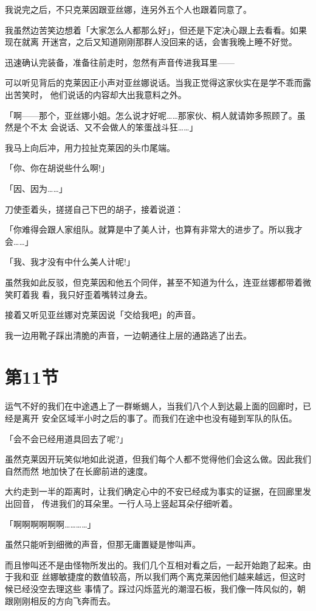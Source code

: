 \documentclass[11pt]{book}
\begin{document}
我说完之后，不只克莱因跟亚丝娜，连另外五个人也跟着同意了。

我虽然边苦笑边想着「大家怎么人都那么好」，但还是下定决心跟上去看看。如果现在就离
开迷宫，之后又知道刚刚那群人没回来的话，会害我晚上睡不好觉。

迅速确认完装备，准备往前走时，忽然有声音传进我耳里——

可以听见背后的克莱因正小声对亚丝娜说话。当我正觉得这家伙实在是学不乖而露出苦笑时，
他们说话的内容却大出我意料之外。

「啊——那个，亚丝娜小姐。怎么说才好呢……那家伙、桐人就请妳多照顾了。虽然是个不太
会说话、又不会做人的笨蛋战斗狂……」

我马上向后冲，用力拉扯克莱因的头巾尾端。

「你、你在胡说些什么啊!」

「因、因为……」

刀使歪着头，搓搓自己下巴的胡子，接着说道：

「你难得会跟人家组队。就算是中了美人计，也算有非常大的进步了。所以我才会……」

「我、我才没有中什么美人计呢!」

虽然我如此反驳，但克莱因和他五个同伴，甚至不知道为什么，连亚丝娜都带着微笑盯着我
看，我只好歪着嘴转过身去。

接着又听见亚丝娜对克莱因说「交给我吧」的声音。

我一边用靴子踩出清脆的声音，一边朝通往上层的通路逃了出去。
\section{第11节}
\label{sec:org422bc75}
运气不好的我们在中途遇上了一群蜥蜴人，当我们八个人到达最上面的回廊时，已经是离开
安全区域半小时之后的事了。而我们在途中也没有碰到军队的队伍。

「会不会已经用道具回去了呢?」

虽然克莱因开玩笑似地如此说道，但我们每个人都不觉得他们会这么做。因此我们自然而然
地加快了在长廊前进的速度。

大约走到一半的距离时，让我们确定心中的不安已经成为事实的证据，在回廊里发出回音，
传进我们的耳朵里。一行人马上竖起耳朵仔细听着。

「啊啊啊啊啊啊…………」

虽然只能听到细微的声音，但那无庸置疑是惨叫声。

而且惨叫还不是由怪物所发出的。我们几个互相对看之后，一起开始跑了起来。由于我和亚
丝娜敏捷度的数值较高，所以我们两个离克莱因他们越来越远，但这时候已经没空去理这些
事情了。踩过闪烁蓝光的潮湿石板，我们像一阵风似的，朝跟刚刚相反的方向飞奔而去。
\end{document}
